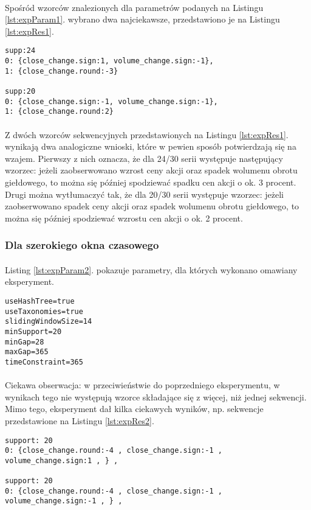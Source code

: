 \documentclass[11pt,a4paper]{article}
\begin{document}
\paragraph{} Spośród wzorców znalezionych dla parametrów podanych na Listingu \ref{lst:expParam1}. wybrano dwa najciekawsze, przedstawiono je na Listingu \ref{lst:expRes1}.
\begin{lstlisting}[caption={Wzorce, eksperyment 1},label={lst:expRes1}]
supp:24
0: {close_change.sign:1, volume_change.sign:-1},
1: {close_change.round:-3}

supp:20
0: {close_change.sign:-1, volume_change.sign:-1},
1: {close_change.round:2}
\end{lstlisting}
\paragraph{}Z dwóch wzorców sekwencyjnych przedstawionych na Listingu \ref{lst:expRes1}. wynikają dwa analogiczne wnioski, które w pewien sposób potwierdzają się na wzajem. Pierwszy z nich oznacza, że dla 24/30 serii występuje następujący wzorzec: jeżeli zaobserwowano wzrost ceny akcji oraz spadek wolumenu obrotu giełdowego, to można się później spodziewać spadku cen akcji o ok. 3 procent. Drugi można wytłumaczyć tak, że dla 20/30 serii występuje wzorzec: jeżeli zaobserwowano spadek ceny akcji oraz spadek wolumenu obrotu giełdowego, to można się później spodziewać wzrostu cen akcji o ok. 2 procent.
\newpage
\subsubsection{Dla szerokiego okna czasowego}
\paragraph{}Listing \ref{lst:expParam2}. pokazuje parametry, dla których wykonano omawiany eksperyment.
\begin{lstlisting}[caption={Parametry, eksperyment 2},label={lst:expParam2}]
useHashTree=true
useTaxonomies=true
slidingWindowSize=14
minSupport=20
minGap=28
maxGap=365
timeConstraint=365
\end{lstlisting}
\paragraph{}Ciekawa obserwacja: w przeciwieństwie do poprzedniego eksperymentu, w wynikach tego nie występują wzorce składające się z więcej, niż jednej sekwencji. Mimo tego, eksperyment dał kilka ciekawych wyników, np. sekwencje przedstawione na Listingu \ref{lst:expRes2}.
\begin{lstlisting}[caption={Wzorce, eksperyment 2},label={lst:expRes2}]
support: 20 
0: {close_change.round:-4 , close_change.sign:-1 , volume_change.sign:1 , } ,

support: 20
0: {close_change.round:-4 , close_change.sign:-1 , volume_change.sign:-1 , } ,
\end{lstlisting}
\end{document}
